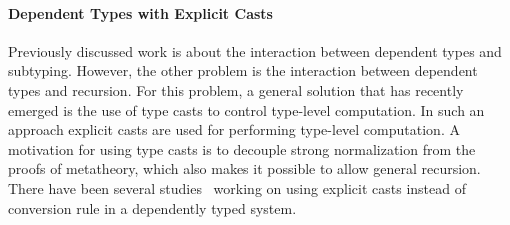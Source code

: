 \paragraph{Dependent Types with Explicit Casts} Previously
discussed work is about the interaction between dependent types and
subtyping. However, the other problem is the
interaction between dependent types and recursion. For this
problem, a general solution that has recently emerged is the use
of type casts to control type-level computation. In such an approach explicit casts
are used for performing type-level computation. A motivation for
using type casts is to decouple strong normalization from the
proofs of metatheory, which also makes it possible to allow general
recursion. There have been several studies~\cite{guru,sjoberg:msfp12,
  kimmel:plpv, zombie:popl15, fc:kind, Doorn:2013hq,isotype} working
on using explicit casts instead of conversion rule in a dependently
typed system. 
